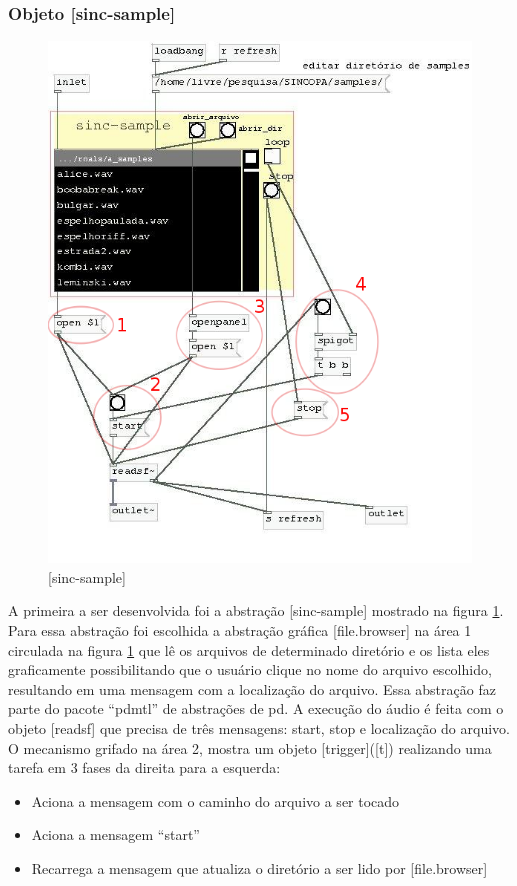 \documentclass{ppgmus}
\begin{document}
\subsubsection{Objeto [sinc-sample]}



\begin{figure}
\includegraphics[scale=.5]{sinc-sample}
\caption{[sinc-sample]}
\label{[sinc-sample]}
\end{figure}



A primeira a ser desenvolvida foi a abstração [sinc-sample] mostrado na figura
\ref{[sinc-sample]}. Para essa abstração foi escolhida a abstração gráfica 
[file.browser] 
na área 1 circulada na figura \ref{[sinc-sample]} que lê os arquivos de determinado
 diretório e os lista eles graficamente possibilitando que
o usuário clique no nome do arquivo escolhido, resultando em uma mensagem com a 
localização
do arquivo. Essa abstração faz parte do pacote ``pdmtl'' de abstrações de pd.
A execução do áudio é feita com o objeto [readsf\texttildelow] que precisa de três mensagens:
start, stop e localização do arquivo. O mecanismo grifado na área 2, mostra
um objeto [trigger]([t]) realizando uma tarefa em 3 fases da direita para a esquerda:
\begin{itemize}
 \item Aciona a mensagem com o caminho do arquivo a ser tocado
 \item Aciona a mensagem ``start''
 \item Recarrega a mensagem que atualiza o diretório a ser lido por [file.browser]
\end{itemize}
\end{document}
